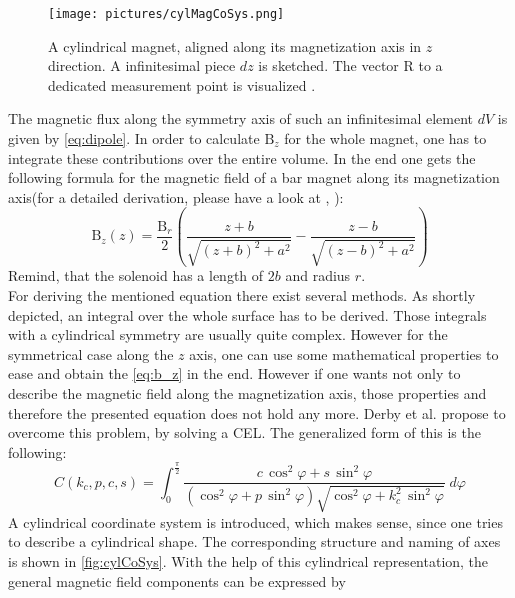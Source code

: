 \begin{figure}
\centering
\texttt{[image: pictures/cylMagCoSys.png]}
\caption[Cylindrical bar magnet with infinitesimal slice $ dz $]
{A cylindrical magnet, aligned along its magnetization axis in $ z $ direction. A infinitesimal piece $ dz $ is sketched. The vector R to a dedicated measurement point is visualized \cite{derby2010cylindrical}.}
\label{fig:cylMag}
\end{figure}
The magnetic flux along the symmetry axis of such an infinitesimal element $ dV $ is given by \ref{eq:dipole}. In order to calculate $ \mathrm{B}_{z} $ for the whole magnet, one has to integrate these contributions over the entire volume. In the end one gets the following formula for the magnetic field of a bar magnet along its magnetization axis(for a detailed derivation, please have a look at \cite{camacho2013alternative}, \cite{derby2010cylindrical}):
\begin{equation} \label{eq:b_z}
\mathrm{B}_{z}(z) = \frac{\mathrm{B}_r}{2} \left ( \frac{z + b}{\sqrt{(z + b)^2 + a^2}} - \frac{z - b}{\sqrt{(z - b)^2 + a^2}} \right)
\end{equation}
Remind, that the solenoid has a length of $ 2b $ and radius $ r $.\\
For deriving the mentioned equation there exist several methods. As shortly depicted, an integral over the whole surface has to be derived. Those integrals with a cylindrical symmetry are usually quite complex. However for the symmetrical case along the $ z $ axis, one can use some mathematical properties to ease and obtain the \ref{eq:b_z} in the end. However if one wants not only to describe the magnetic field along the magnetization axis, those properties and therefore the presented equation does not hold any more. Derby et al. \cite{derby2010cylindrical} propose to overcome this problem, by solving a \ac{CEL}. The generalized form of this is the following:
\begin{equation}\label{eq:cel}
C(k_{c},p,c,s) = \int_{0}^{\frac{\pi}{2}} \frac{c \, \cos^{2}\varphi + s \, \sin^{2}\varphi}
{(\cos^{2}\varphi + p \, \sin^{2}\varphi)\sqrt{\cos^{2}\varphi + k_{c}^{2} \, \sin^{2}\varphi}} \; d\varphi
\end{equation}
A cylindrical coordinate system is introduced, which makes sense, since one tries to describe a cylindrical shape. The corresponding structure and naming of axes is shown in \ref{fig:cylCoSys}. With the help of this cylindrical representation, the general magnetic field components can be expressed by
